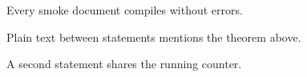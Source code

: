 \documentclass{article}
\begin{document}
\begin{thm}
Every smoke document compiles without errors.
\end{thm}
Plain text between statements mentions the theorem above.
\begin{thm}
A second statement shares the running counter.
\end{thm}
\end{document}
